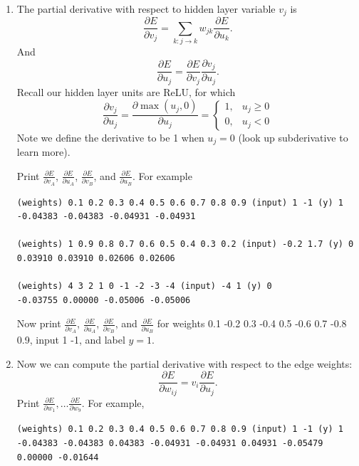 \documentclass[a4paper]{article}
\theoremstyle{definition}
\begin{document}
\begin{enumerate}
Print $E$, $\frac{\partial E}{\partial v_C}$, and $\frac{\partial E}{\partial u_C}$. 
For example,
\begin{verbatim}
(weights) 0.1 0.2 0.3 0.4 0.5 0.6 0.7 0.8 0.9 (input) 1 -1 (y) 1
0.03778 -0.27488 -0.05479

(weights) 1 0.9 0.8 0.7 0.6 0.5 0.4 0.3 0.2 (input) -0.2 1.7 (y) 0
0.31402 0.79249 0.13032

(weights) 4 3 2 1 0 -1 -2 -3 -4 (input) -4 1 (y) 0
0.00710 0.11920 0.01252
\end{verbatim}

Now compute $E$, $\frac{\partial E}{\partial v_C}$, and $\frac{\partial E}{\partial u_C}$ for weights 0.1 -0.2 0.3 -0.4 0.5 -0.6 0.7 -0.8 0.9, input 1 -1, and label $y=1$.

\item 
The partial derivative with respect to hidden layer variable $v_j$ is
$$\frac{\partial E}{\partial v_j} = \sum_{k: j\rightarrow k} w_{jk} \frac{\partial E}{\partial u_k}.$$
And 
$$\frac{\partial E}{\partial u_j} = \frac{\partial E}{\partial v_j} \frac{\partial v_j}{\partial u_j}.$$
Recall our hidden layer units are ReLU, for which
$$\frac{\partial v_j}{\partial u_j}=\frac{\partial \max(u_j, 0)}{\partial u_j}=\left\{
\begin{array}{ll}
1, & u_j \ge 0 \\
0, & u_j < 0 
\end{array}
\right.$$
Note we define the derivative to be 1 when $u_j=0$ (look up subderivative to learn more).

Print $\frac{\partial E}{\partial v_A}$, $\frac{\partial E}{\partial u_A}$, $\frac{\partial E}{\partial v_B}$, and $\frac{\partial E}{\partial u_B}$.
For example
\begin{verbatim}
(weights) 0.1 0.2 0.3 0.4 0.5 0.6 0.7 0.8 0.9 (input) 1 -1 (y) 1
-0.04383 -0.04383 -0.04931 -0.04931

(weights) 1 0.9 0.8 0.7 0.6 0.5 0.4 0.3 0.2 (input) -0.2 1.7 (y) 0
0.03910 0.03910 0.02606 0.02606

(weights) 4 3 2 1 0 -1 -2 -3 -4 (input) -4 1 (y) 0
-0.03755 0.00000 -0.05006 -0.05006
\end{verbatim}
Now print $\frac{\partial E}{\partial v_A}$, $\frac{\partial E}{\partial u_A}$, $\frac{\partial E}{\partial v_B}$, and $\frac{\partial E}{\partial u_B}$ for weights 0.1 -0.2 0.3 -0.4 0.5 -0.6 0.7 -0.8 0.9, input 1 -1, and label $y=1$.

\item
Now we can compute the partial derivative with respect to the edge weights:
$$\frac{\partial E}{\partial w_{ij}} = v_i \frac{\partial E}{\partial u_j}.$$
Print $\frac{\partial E}{\partial w_1}, \ldots \frac{\partial E}{\partial w_9}$. 
For example,
\begin{verbatim}
(weights) 0.1 0.2 0.3 0.4 0.5 0.6 0.7 0.8 0.9 (input) 1 -1 (y) 1
-0.04383 -0.04383 0.04383 -0.04931 -0.04931 0.04931 -0.05479 0.00000 -0.01644


\end{verbatim}
\end{enumerate}
\end{document}
